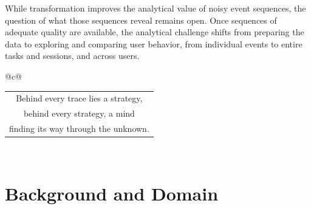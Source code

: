 
While transformation improves the analytical value of noisy event sequences, the question of what those sequences reveal remains open.
Once sequences of adequate quality are available, the analytical challenge shifts from preparing the data to exploring and comparing user behavior, from individual events to entire tasks and sessions, and across users.






\label{cha:pub2}

\begin{center}
\begin{tabular}{@{}c@{}}
\\
{\fmmfamily\LARGE
\begin{tabular}{@{}c@{}}
Behind every trace lies a strategy,\\
behind every strategy, a mind\\
finding its way through the unknown.
\end{tabular}}\\
\end{tabular}
\end{center}





\section{Background and Domain}

